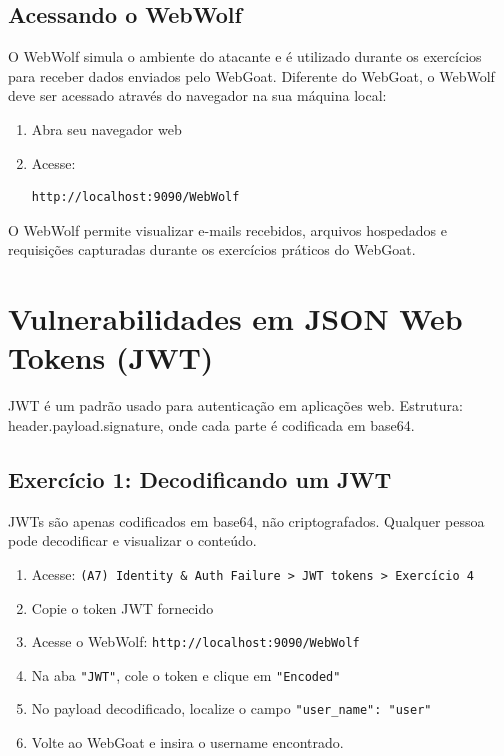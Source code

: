 \documentclass[11pt]{ifscarticle}
\begin{document}
\subsection{Acessando o WebWolf}

O WebWolf simula o ambiente do atacante e é utilizado durante os exercícios para receber dados enviados pelo WebGoat. Diferente do WebGoat, o WebWolf deve ser acessado através do navegador na sua máquina local:

\begin{enumerate}
    \item Abra seu navegador web
    \item Acesse:
\begin{lstlisting}[style=shell]
http://localhost:9090/WebWolf    
\end{lstlisting}
\end{enumerate}
O WebWolf permite visualizar e-mails recebidos, arquivos hospedados e requisições capturadas durante os exercícios práticos do WebGoat.

\section{Vulnerabilidades em JSON Web Tokens (JWT)}

JWT é um padrão usado para autenticação em aplicações web. Estrutura: header.payload.signature, onde cada parte é codificada em base64.

\subsection{Exercício 1: Decodificando um JWT}

JWTs são apenas codificados em base64, não criptografados. Qualquer pessoa pode decodificar e visualizar o conteúdo.

\begin{enumerate}
    \item Acesse: \texttt{(A7) Identity \& Auth Failure > JWT tokens > Exercício 4}
    \item Copie o token JWT fornecido
    \item Acesse o WebWolf: \texttt{http://localhost:9090/WebWolf}
    \item Na aba \texttt{"JWT"}, cole o token e clique em \texttt{"Encoded"}
    \item No payload decodificado, localize o campo \texttt{"user\_name": "user"}
    \item Volte ao WebGoat e insira o username encontrado.
\end{enumerate}
\end{document}
